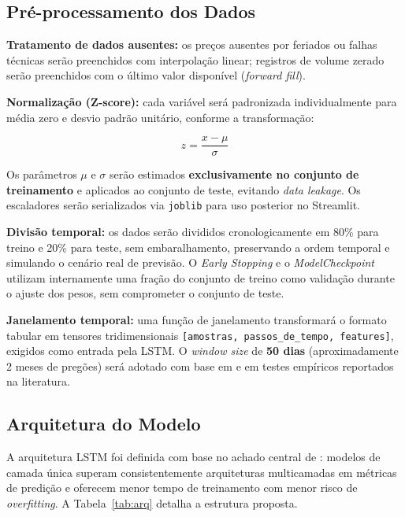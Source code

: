 \documentclass[12pt]{article}
\begin{document}
\subsection{Pré-processamento dos Dados}

\textbf{Tratamento de dados ausentes:} os preços ausentes por feriados ou
falhas técnicas serão preenchidos com interpolação linear; registros de volume
zerado serão preenchidos com o último valor disponível (\textit{forward fill}).

\textbf{Normalização (Z-score):} cada variável será padronizada individualmente
para média zero e desvio padrão unitário, conforme a transformação:

\begin{equation}
  z = \frac{x - \mu}{\sigma}
\end{equation}

Os parâmetros $\mu$ e $\sigma$ serão estimados \textbf{exclusivamente no
conjunto de treinamento} e aplicados ao conjunto de teste, evitando
\textit{data leakage}. Os escaladores serão serializados via
\texttt{joblib} para uso posterior no Streamlit.

\textbf{Divisão temporal:} os dados serão divididos cronologicamente em
80\% para treino e 20\% para teste, sem embaralhamento, preservando a ordem
temporal e simulando o cenário real de previsão. O \textit{Early Stopping}
e o \textit{ModelCheckpoint} utilizam internamente uma fração do conjunto
de treino como validação durante o ajuste dos pesos, sem comprometer o
conjunto de teste.

\textbf{Janelamento temporal:} uma função de janelamento transformará o
formato tabular em tensores tridimensionais \texttt{[amostras,
passos\_de\_tempo, features]}, exigidos como entrada pela LSTM. O
\textit{window size} de \textbf{50 dias} (aproximadamente 2 meses de
pregões) será adotado com base em \cite{zanotto:2026} e em testes empíricos
reportados na literatura.

\subsection{Arquitetura do Modelo}

A arquitetura LSTM foi definida com base no achado central de
\cite{bhandari:2022}: modelos de camada única superam consistentemente
arquiteturas multicamadas em métricas de predição e oferecem menor tempo de
treinamento com menor risco de \textit{overfitting}. A Tabela~\ref{tab:arq}
detalha a estrutura proposta.
\end{document}
